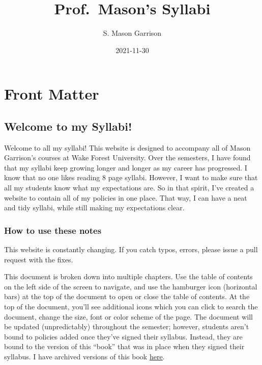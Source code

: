 \documentclass[
]{book}
\title{Prof.~Mason's Syllabi}
\author{S. Mason Garrison}
\date{2021-11-30}
\begin{document}
\maketitle

{
\setcounter{tocdepth}{0}
\tableofcontents
}
\hypertarget{part-front-matter}{%
\part*{Front Matter}\label{part-front-matter}}

\hypertarget{welcome-to-my-syllabi}{%
\chapter*{Welcome to my Syllabi!}\label{welcome-to-my-syllabi}}

Welcome to all my syllabi! This website is designed to accompany all of Mason Garrison's courses at Wake Forest University.
Over the semesters, I have found that my syllabi keep growing longer and longer as my career has progressed.
I know that no one likes reading 8 page syllabi.
However, I want to make sure that all my students know what my expectations are.
So in that spirit, I've created a website to contain all of my policies in one place.
That way, I can have a neat and tidy syllabi, while still making my expectations clear.

\hypertarget{how-to-use-these-notes}{%
\section*{How to use these notes}\label{how-to-use-these-notes}}

This website is constantly changing. If you catch typos, errors, please issue a pull request with the fixes.

This document is broken down into multiple chapters. Use the table of contents on the left side of the screen to navigate, and use the hamburger icon (horizontal bars) at the top of the document to open or close the table of contents. At the top of the document, you'll see additional icons which you can click to search the document, change the size, font or color scheme of the page. The document will be updated (unpredictably) throughout the semester; however, students aren't bound to policies added once they've signed their syllabus. Instead, they are bound to the version of this ``book'' that was in place when they signed their syllabus. I have archived versions of this book \href{https://github.com/smasongarrison/syllabi/tree/main/Previous\%20Semesters}{here}.
\end{document}
